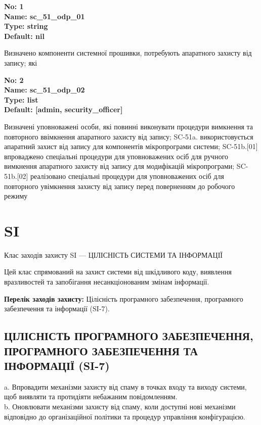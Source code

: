 \documentclass{article}
\begin{document}
\vspace{10pt}
{\footnotesize\bfseries
No: 1\\
Name: sc\_51\_odp\_01\\
Type: string\\
Default: nil
}

{\footnotesize Визначено компоненти системної прошивки, потребують апаратного захисту від запису; які}


{\footnotesize\bfseries
No: 2\\
Name: sc\_51\_odp\_02\\
Type: list\\
Default: [\textquotedbl{}admin\textquotedbl{}, \textquotedbl{}security\_officer\textquotedbl{}]
}

{\footnotesize Визначені уповноважені особи, які повинні виконувати процедури вимкнення та повторного ввімкнення апаратного захисту від запису; SC-51a. використовується апаратний захист від запису для компонентів мікропрограми системи; SC-51b.[01] впроваджено спеціальні процедури для уповноважених осіб для ручного вимкнення апаратного захисту від запису для модифікацій мікропрограми; SC-51b.[02] реалізовано спеціальні процедури для уповноважених осіб для повторного увімкнення захисту від запису перед поверненням до робочого режиму}




\section{SI}
Клас заходів захисту SI --- ЦІЛІСНІСТЬ СИСТЕМИ ТА ІНФОРМАЦІЇ

Цей клас спрямований на захист системи від шкідливого коду, виявлення вразливостей та запобігання несанкціонованим змінам інформації.

\textbf{Перелік заходів захисту:} Цілісність програмного забезпечення, програмного забезпечення та інформації (SI-7).

\subsection{ЦІЛІСНІСТЬ ПРОГРАМНОГО ЗАБЕЗПЕЧЕННЯ, ПРОГРАМНОГО ЗАБЕЗПЕЧЕННЯ ТА ІНФОРМАЦІЇ (SI-7)}
a. Впровадити механізми захисту від спаму в точках входу та виходу системи, щоб виявляти та протидіяти небажаним повідомленням.\\ 
b. Оновлювати механізми захисту від спаму, коли доступні нові механізми відповідно до організаційної політики та процедур управління конфігурацією.
\end{document}
